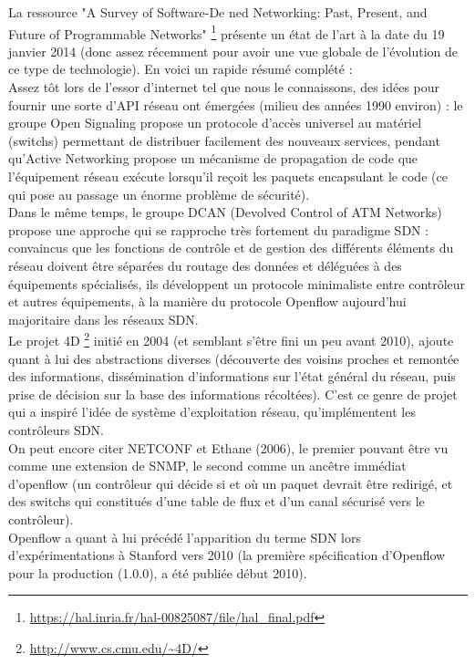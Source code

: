 La ressource "A Survey of Software-De ned Networking: Past, Present, and Future of Programmable Networks" \footnote{\label{histoire}\url{https://hal.inria.fr/hal-00825087/file/hal_final.pdf}} présente un état de l'art à la date du 19 janvier 2014 (donc assez récemment pour avoir une vue globale de l'évolution de ce type de technologie). En voici un rapide résumé complété :\\

Assez tôt lors de l'essor d'internet tel que nous le connaissons, des idées pour fournir une sorte d'API réseau ont émergées (milieu des années 1990 environ) : le groupe Open Signaling propose un protocole d'accès universel au matériel (switchs) permettant de distribuer facilement des nouveaux services, pendant qu'Active Networking propose un mécanisme de propagation de code que l'équipement réseau exécute lorsqu'il reçoit les paquets encapsulant le code (ce qui pose au passage un énorme problème de sécurité).\\

Dans le même temps, le groupe DCAN (Devolved Control of ATM Networks) propose une approche qui se rapproche très fortement du paradigme SDN : convaincus que les fonctions de contrôle et de gestion des différents éléments du réseau doivent être séparées du routage des données et déléguées à des équipements spécialisés, ils développent un protocole minimaliste entre contrôleur et autres équipements, à la manière du protocole Openflow aujourd'hui majoritaire dans les réseaux SDN.\\

Le projet 4D \footnote{\url{http://www.cs.cmu.edu/~4D/}} initié en 2004 (et semblant s'être fini un peu avant 2010), ajoute quant à lui des abstractions diverses (découverte des voisins proches et remontée des informations, dissémination d'informations sur l'état général du réseau, puis prise de décision sur la base des informations récoltées). C'est ce genre de projet qui a inspiré l'idée de système d'exploitation réseau, qu'implémentent les contrôleurs SDN.\\

On peut encore citer NETCONF et Ethane (2006), le premier pouvant être vu comme une extension de SNMP, le second comme un ancêtre immédiat d'openflow (un contrôleur qui décide si et où un paquet devrait être redirigé, et des switchs qui constitués d'une table de flux et d'un canal sécurisé vers le contrôleur).\\

Openflow a quant à lui précédé l'apparition du terme SDN lors d'expérimentations à Stanford vers 2010 (la première spécification d'Openflow pour la production (1.0.0), a été publiée début 2010).